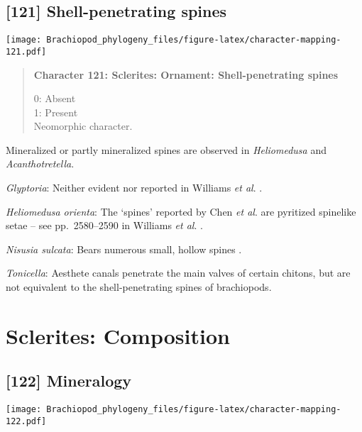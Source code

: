 \documentclass[openany]{book}
\theoremstyle{definition}
\theoremstyle{definition}
\theoremstyle{definition}
\theoremstyle{remark}
\begin{document}
\subsection*{{[}121{]} Shell-penetrating
spines}\label{shell-penetrating-spines}

\texttt{[image: Brachiopod\_phylogeny\_files/figure-latex/character-mapping-121.pdf]}

\begin{quote}
\textbf{Character 121: Sclerites: Ornament: Shell-penetrating spines}

0: Absent\\
1: Present\\
Neomorphic character.
\end{quote}

Mineralized or partly mineralized spines are observed in
\emph{Heliomedusa} and \emph{Acanthotretella}.

\hypertarget{Glyptoria-coding-121}{}
\emph{Glyptoria}: Neither evident nor reported in Williams \emph{et al}.
\citeyearpar{Williams2000LinguliformeaCraniiformea}.

\hypertarget{Heliomedusa_orienta-coding-121}{}
\emph{Heliomedusa orienta}: The `spines' reported by Chen \emph{et al}.
\citeyearpar{Chen2007Reinterpretationof} are pyritized spinelike setae
-- see pp.~2580--2590 in Williams \emph{et al}.
\citeyearpar{Williams2007Supplement}.

\hypertarget{Nisusia_sulcata-coding-121}{}
\emph{Nisusia sulcata}: Bears numerous small, hollow spines
\citep{Williams2000LinguliformeaCraniiformea}.

\hypertarget{Tonicella-coding-121}{}
\emph{Tonicella}: Aesthete canals penetrate the main valves of certain
chitons, but are not equivalent to the shell-penetrating spines of
brachiopods.

\section{Sclerites: Composition}\label{sclerites-composition}

\subsection*{{[}122{]} Mineralogy}\label{mineralogy}

\texttt{[image: Brachiopod\_phylogeny\_files/figure-latex/character-mapping-122.pdf]}
\end{document}
